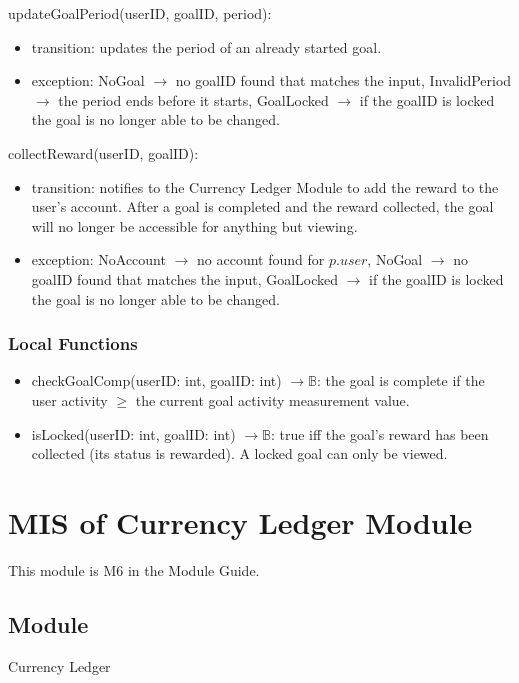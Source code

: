 \documentclass[12pt, titlepage]{article}
\begin{document}
\noindent updateGoalPeriod(userID, goalID, period):
\begin{itemize}
\item transition: updates the period of an already started goal.
\item exception: NoGoal $\longrightarrow$ no goalID found that matches the input, InvalidPeriod $\longrightarrow$ the period ends before it starts, GoalLocked $\longrightarrow$ if the goalID is locked the goal is no longer able to be changed.
\end{itemize}

\noindent collectReward(userID, goalID):
\begin{itemize}
\item transition: notifies to the Currency Ledger Module to add the reward to the user's account. After a goal is completed and the reward collected, the goal will no longer be accessible for anything but viewing.  
\item exception: NoAccount $\longrightarrow$ no account found for $p.\mathit{user}$, NoGoal $\longrightarrow$ no goalID found that matches the input,  GoalLocked $\longrightarrow$ if the goalID is locked the goal is no longer able to be changed.
\end{itemize}


\subsubsection{Local Functions}
\begin{itemize}
    \item checkGoalComp(userID: int, goalID: int) $\longrightarrow \mathbb{B}$: the goal is complete if the user activity $\geq$ the current goal activity measurement value.
    \item isLocked(userID: int, goalID: int) $\longrightarrow \mathbb{B}$: true iff the goal's reward has been collected (its status is rewarded). A locked goal can only be viewed.
\end{itemize}

\section{MIS of Currency Ledger Module} \label{misCur}

This module is M6 in the Module Guide.

\subsection{Module}
Currency Ledger
\end{document}
